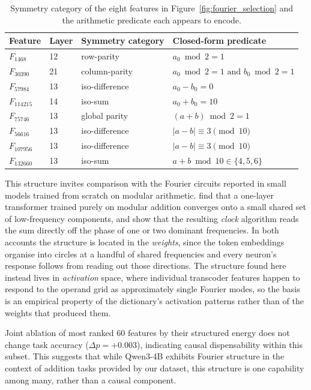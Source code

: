 \begin{table}[ht!]
\centering
\small
\begin{tabular}{@{}llll@{}}
\toprule
Feature & Layer & Symmetry category & Closed-form predicate \\
\midrule
$F_{1468}$   & 12 & row-parity      & $a_0 \bmod 2 = 1$ \\
$F_{30390}$  & 21 & column-parity   & $a_0 \bmod 2 = 1 \text{ and } b_0 \bmod 2 = 1$ \\
$F_{57984}$  & 13 & iso-difference  & $a_0 - b_0 = 0$ \\
$F_{114215}$ & 14 & iso-sum         & $a_0 + b_0 = 10$ \\
$F_{75746}$  & 13 & global parity   & $(a+b)\bmod 2 = 1$ \\
$F_{56616}$  & 13 & iso-difference  & $|a-b| \equiv 3 \pmod{10}$ \\
$F_{107956}$ & 13 & iso-difference  & $|a-b| \equiv 3 \pmod{10}$ \\
$F_{132660}$ & 13 & iso-sum         & $a+b \bmod 10 \in \{4,5,6\}$ \\
\bottomrule
\end{tabular}
\caption{Symmetry category of the eight features in Figure~\ref{fig:fourier_selection}
and the arithmetic predicate each appears to encode.}
\label{tab:fourier_features}
\end{table}
\clearpage
This structure invites comparison with the Fourier circuits reported in small models
trained from scratch on modular arithmetic. \citet{nanda2023progress} find that a
one-layer transformer trained purely on modular addition converges onto a small
shared set of low-frequency components, and \citet{zhong2023clock} show that the
resulting \emph{clock} algorithm reads the sum directly off the phase of one or two
dominant frequencies. In both accounts the structure is located in the
\emph{weights}, since the token embeddings organise into circles at a handful of
shared frequencies and every neuron's response follows from reading out those
directions. The structure found here instead lives in \emph{activation} space,
where individual transcoder features happen to respond to the operand grid as
approximately single Fourier modes, so the basis is an empirical property of the
dictionary's activation patterns rather than of the weights that produced them.

Joint ablation of most ranked 60 features by their structured energy does not change task accuracy (\(\Delta p = +0.003\)), indicating
causal dispensability within this subset. This suggests that while Qwen3-4B exhibits Fourier structure in the context
of addition tasks provided by our dataset,
 this structure is one capability among many, rather than a causal component.

